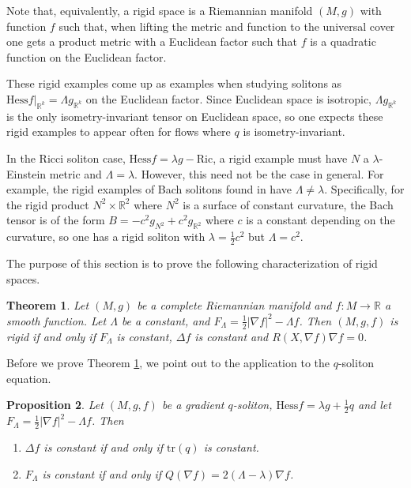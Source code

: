 \documentclass{amsart}
\theoremstyle{plain}
\newtheorem{theorem}{\bf Theorem}[section]
\newtheorem{proposition}[theorem]{\bf Proposition}
\numberwithin{equation}{section}
\begin{document}
Note that, equivalently, a rigid space is a Riemannian manifold $(M,g)$ with function $f$ such that, when lifting the metric and function to the universal cover one gets a product metric with a Euclidean factor such that $f$ is a quadratic function on the Euclidean factor. 

These rigid examples come up as examples when studying solitons as $\mathrm{Hess} f|_{\mathbb{R}^k} = \Lambda g_{\mathbb{R}^k}$ on the Euclidean factor.  Since Euclidean space is isotropic,  $\Lambda g_{\mathbb{R}^k}$ is the only isometry-invariant tensor on Euclidean space, so one expects these rigid examples to appear often for flows where $q$ is isometry-invariant.  

In the Ricci soliton case, $\mathrm{Hess} f = \lambda g - \mathrm{Ric}$,  a rigid example must have $N$ a $\lambda$- Einstein metric and $\Lambda = \lambda$.  However, this need not be the case in general.  For example,  the rigid examples of Bach solitons found in \cite{Griffin, Ho} have $\Lambda \neq \lambda$.  Specifically,  for the rigid product $N^2 \times \mathbb{R}^2$ where $N^2$ is a surface of constant curvature, the Bach tensor is of the form $B = -c^2 g_{N^2} + c^2 g_{\mathbb{R}^2}$ where $c$ is a constant depending on the curvature, so one has a rigid soliton with $\lambda = \frac{1}{2} c^2$ but $\Lambda = c^2$. 

The purpose of this section is to prove the following characterization of rigid spaces. 

\begin{theorem}  \label{thm-rigid}
Let $(M,g)$ be a complete Riemannian manifold and $f:M \to \mathbb{R}$ a smooth function.  Let $\Lambda$ be a constant, and $F_{\Lambda} = \frac{1}{2}|\nabla f|^2 - \Lambda f$.  Then $(M,g,f)$ is rigid if and only if 
$F_{\Lambda}$ is constant, $\Delta f$ is constant  and $R(X, \nabla f) \nabla f = 0$. 
\end{theorem}

Before we prove Theorem \ref{thm-rigid}, we point out to the application to the $q$-soliton equation. 

\begin{proposition}\label{Prop Q}
    Let $(M,g, f)$ be a gradient $q$-soliton, $ \mathrm{Hess} f = \lambda g + \frac{1}{2} q $ and let $F_{\Lambda} = \frac{1}{2}|\nabla f|^2 -  \Lambda f$.  Then 
    \begin{enumerate}
        \item $\Delta f$ is constant if and only if $\mathrm{tr}(q)$ is constant.
        \item $F_{\Lambda}$ is constant if and only if $Q(\nabla f) = 2(\Lambda - \lambda) \nabla f$. 
         \end{enumerate}
\end{proposition}
\end{document}
